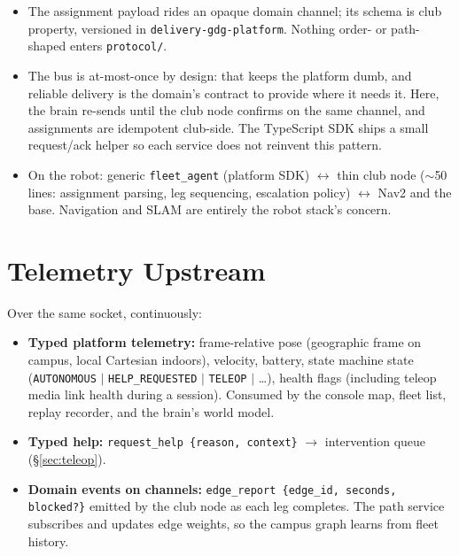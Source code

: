 \documentclass[11pt]{article}
\begin{document}
\begin{itemize}[itemsep=1pt]
  \item The assignment payload rides an opaque domain channel; its schema is club
        property, versioned in \texttt{delivery-gdg-platform}. Nothing order- or
        path-shaped enters \texttt{protocol/}.
  \item The bus is at-most-once by design: that keeps the platform dumb, and
        reliable delivery is the domain's contract to provide where it needs it.
        Here, the brain re-sends until the club node confirms on the same channel,
        and assignments are idempotent club-side. The TypeScript SDK ships a small
        request/ack helper so each service does not reinvent this pattern.
  \item On the robot: generic \texttt{fleet\_agent} (platform SDK) $\leftrightarrow$
        thin club node ($\sim$50 lines: assignment parsing, leg sequencing, escalation
        policy) $\leftrightarrow$ Nav2 and the base. Navigation and SLAM are entirely
        the robot stack's concern.
\end{itemize}

\section{Telemetry Upstream}

Over the same socket, continuously:

\begin{itemize}[itemsep=1pt]
  \item \textbf{Typed platform telemetry:} frame-relative pose (geographic frame on
        campus, local Cartesian indoors), velocity, battery, state machine state
        (\texttt{AUTONOMOUS} $|$ \texttt{HELP\_REQUESTED} $|$ \texttt{TELEOP} $|$
        \dots), health flags (including teleop media link health during a session).
        Consumed by the console map, fleet list, replay recorder, and the brain's
        world model.
  \item \textbf{Typed help:} \texttt{request\_help \{reason, context\}} $\to$
        intervention queue (\S\ref{sec:teleop}).
  \item \textbf{Domain events on channels:} \texttt{edge\_report \{edge\_id, seconds,
        blocked?\}} emitted by the club node as each leg completes. The path service
        subscribes and updates edge weights, so the campus graph learns from fleet
        history.
\end{itemize}
\end{document}
